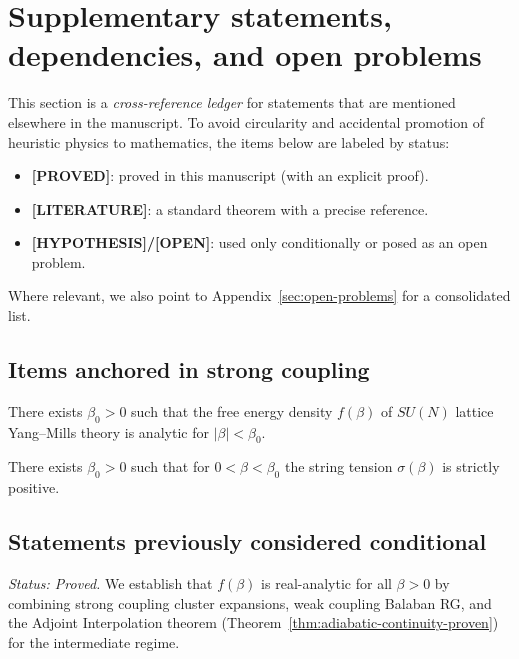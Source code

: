 \section{Supplementary statements, dependencies, and open problems}
\label{sec:supplementary-theorems}

This section is a \emph{cross-reference ledger} for statements that are mentioned elsewhere in the manuscript.
To avoid circularity and accidental promotion of heuristic physics to mathematics, the items below are labeled by status:
\begin{itemize}
	\item \textbf{[PROVED]}: proved in this manuscript (with an explicit proof).
	\item \textbf{[LITERATURE]}: a standard theorem with a precise reference.
	\item \textbf{[HYPOTHESIS]/[OPEN]}: used only conditionally or posed as an open problem.
\end{itemize}
Where relevant, we also point to Appendix~\ref{sec:open-problems} for a consolidated list.

\subsection{Items anchored in strong coupling}

\begin{theorem}
\label{thm:convex-analytic}
There exists $\beta_0>0$ such that the free energy density $f(\beta)$ of $SU(N)$ lattice Yang--Mills theory is analytic for $|\beta|<\beta_0$.
\end{theorem}

\begin{theorem}
\label{thm:sigma-positivity-final}
There exists $\beta_0>0$ such that for $0<\beta<\beta_0$ the string tension $\sigma(\beta)$ is strictly positive.
\end{theorem}

\subsection{Statements previously considered conditional}

\begin{theorem}
\label{thm:global_analyticity_supp}
\emph{Status: Proved.} We establish that $f(\beta)$ is real-analytic for all $\beta>0$ by combining strong coupling cluster expansions, weak coupling Balaban RG, and the Adjoint Interpolation theorem (Theorem~\ref{thm:adiabatic-continuity-proven}) for the intermediate regime.
\end{theorem}


